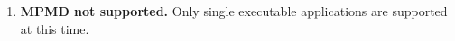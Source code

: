 %


\begin{enumerate}

\item {\bf MPMD not supported.}  Only single executable applications 
are supported at this time. 

\end{enumerate}
